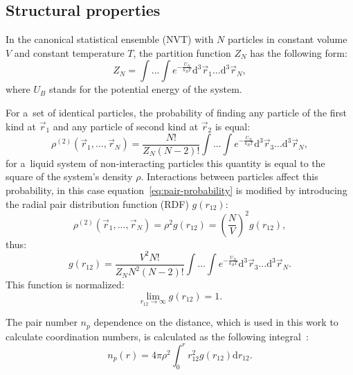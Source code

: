 \subsection{Structural properties}
\label{subsection:structural-properties}

In the canonical statistical ensemble (NVT) with $N$ particles in constant volume $V$ and constant temperature $T$, the partition function $Z_N$ has the following form:
\begin{equation}
    Z_N = \int ... \int e^{-\frac{U_N}{k_B T}} \text{d}^3 \vec{r}_1 ... \text{d}^3 \vec{r}_N,
\end{equation}
where $U_B$ stands for the potential energy of the system.

For a~set of identical particles, the probability of finding any particle of the first kind at $\vec{r}_1$ and any particle of second kind at $\vec{r}_2$ is equal:
\begin{equation}
    \rho^{(2)}(\vec{r}_1, ..., \vec{r}_N) = \frac{N!}{Z_N (N - 2)!} \int ... \int e^{-\frac{U_N}{k_B T}} \text{d}^3 \vec{r}_3 ... \text{d}^3 \vec{r}_N,
    \label{eq:pair-probability}
\end{equation}
for a~liquid system of non-interacting particles this quantity is equal to the square of the system's density $\rho$. Interactions between particles affect this probability, in this case equation~\ref{eq:pair-probability} is modified by introducing the radial pair distribution function (RDF) $g(r_{12})$:
\begin{equation}
    \rho^{(2)}(\vec{r}_1, ..., \vec{r}_N) = \rho^2 g(r_{12}) = \left( \frac{N}{V} \right)^2 g(r_{12}),
\end{equation}
thus:
\begin{equation}
    g(r_{12}) = \frac{V^2 N!}{Z_N N^2 (N-2)!} \int ... \int e^{-\frac{U_N}{k_B T}} \text{d}^3 \vec{r}_3 ... \text{d}^3 \vec{r}_N.
\end{equation}
This function is normalized:
\begin{equation}
    \lim_{r_{12} \rightarrow \infty} g(r_{12}) = 1.
\end{equation}

The pair number $n_p$ dependence on the distance, which is used in this work to calculate coordination numbers, is calculated as the following integral~\cite{statistical-mechanics}:
\begin{equation}
    n_p (r) = 4 \pi \rho^2 \int_0^{r} r^2_{12} g(r_{12}) \text{d}r_{12}.
\end{equation}


